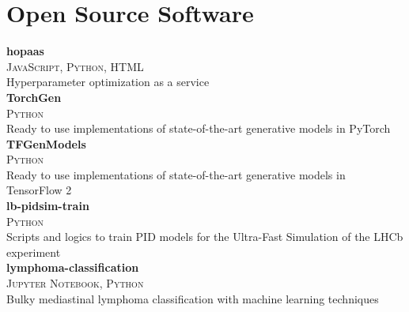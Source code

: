 \newcommand{\pkgname}[1]
  {\normalsize \color{hlcolor-0} \textbf{#1}}

\newcommand{\pkginfo}[1]
  {\small \color{hlcolor-1} \textsc{#1}}
  
\newcommand{\pkgdesc}[1]
  {\normalsize \color{maincolor} {#1}}


\section*{Open Source Software}
\begin{cvcontent}
  \pkgname{hopaas} \hfill
  \\
  \pkginfo{JavaScript, Python, HTML}\\
  \pkgdesc{Hyperparameter optimization as a service}
  \\ [3mm]
  \pkgname{TorchGen} \hfill
  \\
  \pkginfo{Python}\\
  \pkgdesc{Ready to use implementations of state-of-the-art generative models in PyTorch}
  \\ [3mm]
  \pkgname{TFGenModels} \hfill
  \\
  \pkginfo{Python}\\
  \pkgdesc{Ready to use implementations of state-of-the-art generative models in TensorFlow 2}
  \\ [3mm]
  \pkgname{lb-pidsim-train} \hfill
  \\
  \pkginfo{Python}\\
  \pkgdesc{Scripts and logics to train PID models for the Ultra-Fast Simulation of the LHCb experiment}
  \\ [3mm]
  \pkgname{lymphoma-classification} \hfill
  \\
  \pkginfo{Jupyter Notebook, Python}\\
  \pkgdesc{Bulky mediastinal lymphoma classification with machine learning techniques}

\end{cvcontent}
